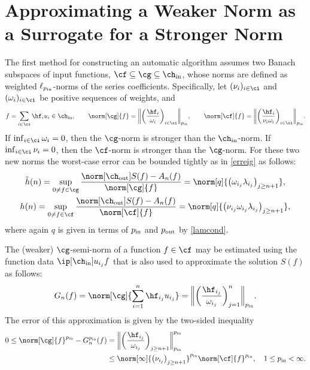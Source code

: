 \documentclass[final]{elsarticle}
\newcommand{\chin}{\ch_{\text{\rm{in}}}}
\newcommand{\chout}{\ch_{\text{\rm{out}}}}
\newcommand{\pin}{p_{\text{\rm{in}}}}
\newcommand{\pout}{p_{\text{\rm{out}}}}
\theoremstyle{definition}
\theoremstyle{remark}
\begin{document}
\section{Approximating a Weaker Norm as a Surrogate for a Stronger Norm}

The first method for constructing an automatic algorithm assumes two Banach subspaces of input functions, $\cf \subseteq \cg \subseteq \chin$, whose norms are defined as weighted $\ell_{\pin}$-norms of the series coefficients.  Specifically, let $(\nu_i)_{i \in \ci}$ and $(\omega_i)_{i \in \ci}$ be positive sequences of weights, and
\begin{equation*}
f = \sum_{i \in \ci} \hf_i u_i \in \chin, \qquad \norm[\cg]{f}=\bigg\lVert\bigg(\frac{\hf_i}{\omega_i}\bigg)_{i\in \ci}\bigg\rVert_{\pin}, \qquad \norm[\cf]{f}=\bigg\lVert\bigg(\frac{\hf_i}{\nu_i\omega_i}\bigg)_{i\in \ci}\bigg\rVert_{\pin}.
\end{equation*}
If $\inf_{i \in \ci} \omega_i = 0$, then the $\cg$-norm is stronger than the $\chin$-norm.  If $\inf_{i \in \ci} \nu_i = 0$, then the $\cf$-norm is stronger than the $\cg$-norm.
For these two new norms the worst-case error can be bounded tightly as in \eqref{erreig} as follows:
\begin{gather}
\nonumber \label{erreigweakG}
\tilde{h}(n)=\sup_{0 \ne f \in \cg}\frac{\norm[\chout]{S(f)-A_n(f)}}{\norm[\cg]{f}} = \norm[q]{\left(\omega_{i_j} \lambda_{i_j} \right)_{j\ge n+1}}, \\
\label{erreigweakF}
h(n)=\sup_{0 \ne f \in \cf}\frac{\norm[\chout]{S(f)-A_n(f)}}{\norm[\cf]{f}} = \norm[q]{\left(\nu_{i_j} \omega_{i_j} \lambda_{i_j} \right)_{j\ge n+1}},
\end{gather}
where again $q$ is given in terms of $\pin$ and $\pout$ by \eqref{lamcond}.

The (weaker) $\cg$-semi-norm of a function $f \in \cf$ may be estimated using the function data $\ip[\chin]{u_{i_j}}{f}$ that is also used to approximate the solution $S(f)$ as follows:
\begin{equation} \label{genLGalg}
G_n(f) = \norm[\cg]{\sum_{i=1}^n \hf_{i_j} u_{i_j} } = \bigg\lVert\bigg(\frac{\hf_{i_j}}{\omega_{i_j}}\bigg)_{j=1}^n\bigg\rVert_{\pin}.
\end{equation}
The error of this approximation is given by the two-sided inequality
\begin{align*}
0 \le \norm[\cg]{f}^{\pin} - G_n^{\pin}(f)
&= \bigg\lVert\bigg(\frac{\hf_{i_j}}{\omega_{i_j}}\bigg)_{j\ge n+1}\bigg\rVert_{\pin}^{\pin} \\
& \le \norm[\infty]{\left(\nu_{i_j} \right)_{j\ge n+1}}^{\pin} \norm[\cf]{f}^{\pin}, \quad 1 \le \pin <  \infty.
\end{align*}
\end{document}
